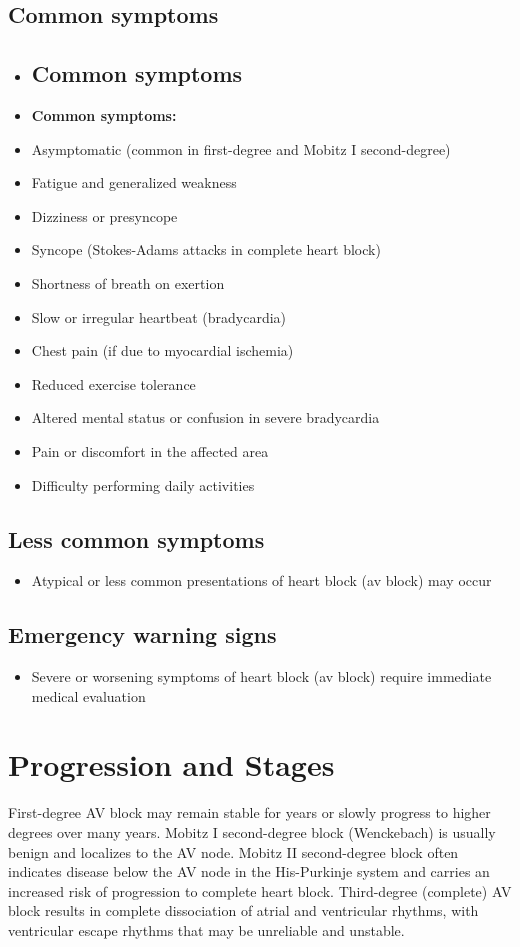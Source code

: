 \subsection{Common symptoms}
\begin{itemize}[noitemsep]
  \item \subsection{Common symptoms}
  \item \textbf{Common symptoms:}
  \item Asymptomatic (common in first-degree and Mobitz I second-degree)
  \item Fatigue and generalized weakness
  \item Dizziness or presyncope
  \item Syncope (Stokes-Adams attacks in complete heart block)
  \item Shortness of breath on exertion
  \item Slow or irregular heartbeat (bradycardia)
  \item Chest pain (if due to myocardial ischemia)
  \item Reduced exercise tolerance
  \item Altered mental status or confusion in severe bradycardia
  \item Pain or discomfort in the affected area
  \item Difficulty performing daily activities
\end{itemize}

\subsection{Less common symptoms}
\begin{itemize}[noitemsep]
  \item Atypical or less common presentations of heart block (av block) may occur
\end{itemize}

\subsection{Emergency warning signs}
\begin{itemize}[noitemsep]
  \item Severe or worsening symptoms of heart block (av block) require immediate medical evaluation
\end{itemize}
\section{Progression and Stages}
First-degree AV block may remain stable for years or slowly progress to higher degrees over many years. Mobitz I second-degree block (Wenckebach) is usually benign and localizes to the AV node. Mobitz II second-degree block often indicates disease below the AV node in the His-Purkinje system and carries an increased risk of progression to complete heart block. Third-degree (complete) AV block results in complete dissociation of atrial and ventricular rhythms, with ventricular escape rhythms that may be unreliable and unstable.

